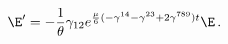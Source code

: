 \begin{equation}
\E^{\prime}=-\frac{1}{\theta}\gamma_{12}e^{\frac{\mu}{6}(-\gamma^{14}-\gamma^{23}+2\gamma^{789})t}\E\,.
\end{equation}

